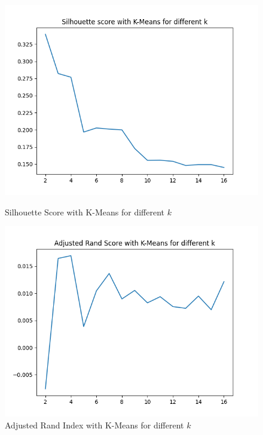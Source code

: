 \begin{figure}
	\hspace{-1cm}\begin{minipage}[b]{0.4\paperwidth}
	\centerline{\includegraphics[width=\textwidth]{Imagenes/Bitmap/normkmeanssil.png}}%
	\caption{Silhouette Score with K-Means for different $k$}%
	\label{fig:nkmeanssil}
	\end{minipage}
	\hspace{0.4cm}
	\begin{minipage}[b]{0.4\paperwidth}
		\centerline{\includegraphics[width=\textwidth]{Imagenes/Bitmap/normkmeansrand.png}}%
		\caption{Adjusted Rand Index with K-Means for different $k$}%
		\label{fig:nkmeansari}
	\end{minipage}
\end{figure}

